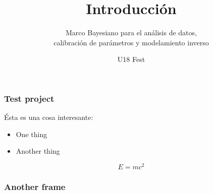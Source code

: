 \documentclass{beamer}
\subtitle{Marco Bayesiano para el análisis de datos,\\
calibración de parámetros y modelamiento inverso}
\title{Introducción}
\institute{Universidad Industrial de Santander}
\date{U18 Fest}
\begin{document}
\begin{frame}[noframenumbering]
  \titlepage
\end{frame}

\begin{frame}
  \frametitle{Test project}

  Ésta es una cosa interesante:

  \begin{itemize}
  \item One thing
  \item Another thing
  \end{itemize}

  \begin{equation*}
    E = mc^2
  \end{equation*}
\end{frame}

\begin{frame}
  \frametitle{Another frame}
\end{frame}
\end{document}
